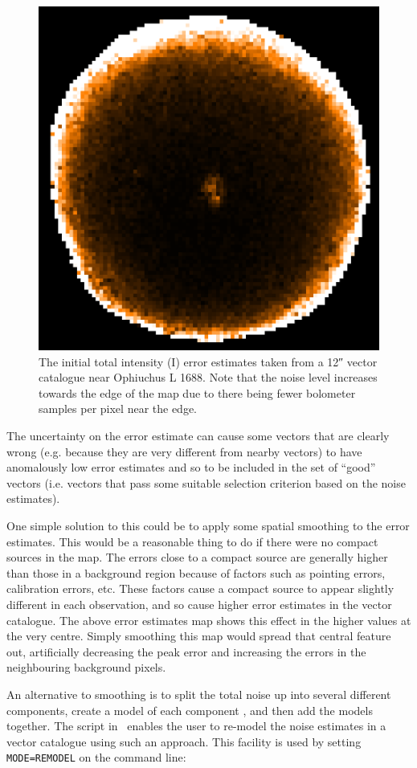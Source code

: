 \begin{figure}[ht!]
\begin{center}
\includegraphics[width=0.46\linewidth]{sc22-ophl1688-noise_on_error-1.png}
\caption [Original Error Estimates in POL-2 Vector Catalogue for Oph L1688]{
  The initial total intensity (I) error estimates taken from a 12\si{\arcsecond} vector catalogue near Ophiuchus L 1688. Note that the noise level increases towards the edge of the map due to there being fewer bolometer samples per pixel near the edge.
\label{fig:originalerrors}
}
\end{center}
\end{figure}

The uncertainty on the error estimate can cause some vectors that are clearly wrong (e.g. because they are very different from nearby vectors) to have anomalously low error estimates and so to be included in the set of ``good'' vectors (i.e. vectors that pass some suitable selection criterion based on the noise estimates).

One simple solution to this could be to apply some spatial smoothing to the error estimates. This would be a reasonable thing to do if there were no compact sources in the map. The errors close to a compact source are generally higher than those in a background region because of factors such as pointing errors, calibration errors, etc. These factors cause a compact source to appear slightly different in each observation, and so cause higher error estimates in the vector catalogue. The above error estimates map shows this effect in the higher values at the very centre. Simply smoothing this map would spread that central feature out, artificially decreasing the peak error and increasing the errors in the neighbouring background pixels.

An alternative to smoothing is to split the total noise up into several different components, create a model of each component , and then add the models together. The  script in \smurf\ enables the user to re-model the noise estimates in a vector catalogue using such an approach. This facility is used by setting \texttt{MODE=REMODEL} on the  command line:

